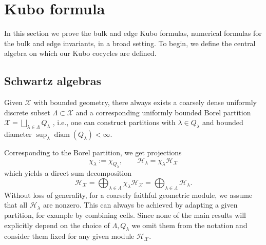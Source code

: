 \documentclass[12pt]{amsart}
\newcommand{\Hh}{{\mathcal H}}
\newcommand{\Xx}{{\mathcal X}}
\DeclareMathOperator{\diam}{diam}
\begin{document}
\section{Kubo formula}
\label{sec:kubo}
In this section we prove the bulk and edge Kubo formulas, numerical formulas for the bulk and edge invariants, in a broad setting.
To begin, we define the central algebra on which our Kubo cocycles are defined.

\subsection{Schwartz algebras}
\label{sec:poly}

Given $\Xx$ with bounded geometry, there always exists a coarsely dense uniformly discrete subset $\Lambda\subset \Xx$ and a corresponding uniformly bounded Borel partition $\Xx= \bigsqcup_{\lambda \in \Lambda} Q_\lambda$ \cite[Remark 8.2]{Spakula2009}, i.e., one can construct partitions with $\lambda\in Q_\lambda$ and bounded diameter $\sup_{\lambda}\diam(Q_{\lambda}) < \infty$. 

Corresponding to the Borel partition, we get projections  
$$\chi_\lambda := \chi_{Q_\lambda}, \qquad \Hh_\lambda = \chi_\lambda \Hh_\Xx$$
which yields a direct sum decomposition
$$\Hh_\Xx = \bigoplus_{\lambda\in \Lambda} \chi_{\lambda}\Hh_\Xx= \bigoplus_{\lambda\in \Lambda} \Hh_\lambda.$$
Without loss of generality, for a coarsely faithful geometric module, we assume that all $\Hh_{\lambda}$ are nonzero. This can always be achieved by adapting a given partition, for example by combining cells. 
Since none of the main results will explicitly depend on the choice of $\Lambda, Q_\lambda$ we omit them from the notation and consider them fixed for any given module $\Hh_\Xx$.
\end{document}
